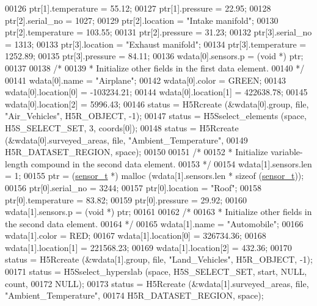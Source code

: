 \begin{DoxyCode}
00126     ptr[1].temperature = 55.12;
00127     ptr[1].pressure = 22.95;
00128     ptr[2].serial\_no = 1027;
00129     ptr[2].location = \textcolor{stringliteral}{"Intake manifold"};
00130     ptr[2].temperature = 103.55;
00131     ptr[2].pressure = 31.23;
00132     ptr[3].serial\_no = 1313;
00133     ptr[3].location = \textcolor{stringliteral}{"Exhaust manifold"};
00134     ptr[3].temperature = 1252.89;
00135     ptr[3].pressure = 84.11;
00136     wdata[0].sensors.p = (\textcolor{keywordtype}{void} *) ptr;
00137 
00138     \textcolor{comment}{/*}
00139 \textcolor{comment}{     * Initialize other fields in the first data element.}
00140 \textcolor{comment}{     */}
00141     wdata[0].name = \textcolor{stringliteral}{"Airplane"};
00142     wdata[0].color = GREEN;
00143     wdata[0].location[0] = -103234.21;
00144     wdata[0].location[1] = 422638.78;
00145     wdata[0].location[2] = 5996.43;
00146     status = H5Rcreate (&wdata[0].group, file, \textcolor{stringliteral}{"Air\_Vehicles"}, H5R\_OBJECT, -1);
00147     status = H5Sselect\_elements (space, H5S\_SELECT\_SET, 3, coords[0]);
00148     status = H5Rcreate (&wdata[0].surveyed\_areas, file, \textcolor{stringliteral}{"Ambient\_Temperature"},
00149                 H5R\_DATASET\_REGION, space);
00150 
00151     \textcolor{comment}{/*}
00152 \textcolor{comment}{     * Initialize variable-length compound in the second data element.}
00153 \textcolor{comment}{     */}
00154     wdata[1].sensors.len = 1;
00155     ptr = (\hyperlink{structsensor__t}{sensor\_t} *) malloc (wdata[1].sensors.len * sizeof (\hyperlink{structsensor__t}{sensor\_t}));
00156     ptr[0].serial\_no = 3244;
00157     ptr[0].location = \textcolor{stringliteral}{"Roof"};
00158     ptr[0].temperature = 83.82;
00159     ptr[0].pressure = 29.92;
00160     wdata[1].sensors.p = (\textcolor{keywordtype}{void} *) ptr;
00161 
00162     \textcolor{comment}{/*}
00163 \textcolor{comment}{     * Initialize other fields in the second data element.}
00164 \textcolor{comment}{     */}
00165     wdata[1].name = \textcolor{stringliteral}{"Automobile"};
00166     wdata[1].color = RED;
00167     wdata[1].location[0] = 326734.36;
00168     wdata[1].location[1] = 221568.23;
00169     wdata[1].location[2] = 432.36;
00170     status = H5Rcreate (&wdata[1].group, file, \textcolor{stringliteral}{"Land\_Vehicles"}, H5R\_OBJECT, -1);
00171     status = H5Sselect\_hyperslab (space, H5S\_SELECT\_SET, start, NULL, count,
00172                 NULL);
00173     status = H5Rcreate (&wdata[1].surveyed\_areas, file, \textcolor{stringliteral}{"Ambient\_Temperature"},
00174                 H5R\_DATASET\_REGION, space);

\end{DoxyCode}
